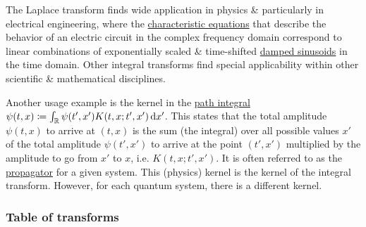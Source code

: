 \documentclass{article}
\begin{document}
The Laplace transform finds wide application in physics \& particularly in electrical engineering, where the \href{https://en.wikipedia.org/wiki/Characteristic_equation_(calculus)}{characteristic equations} that describe the behavior of an electric circuit in the complex frequency domain correspond to linear combinations of exponentially scaled \& time-shifted \href{https://en.wikipedia.org/wiki/Damped_sinusoid}{damped sinusoids} in the time domain. Other integral transforms find special applicability within other scientific \& mathematical disciplines.

Another usage example is the kernel in the \href{https://en.wikipedia.org/wiki/Path_integral_formulation#Path_integral_in_quantum_mechanics}{path integral} $\psi(t,x)\coloneqq\int_\mathbb{R} \psi(t',x')K(t,x;t',x')\,{\rm d}x'$. This states that the total amplitude $\psi(t,x)$ to arrive at $(t,x)$ is the sum (the integral) over all possible values $x'$ of the total amplitude $\psi(t',x')$ to arrive at the point $(t',x')$ multiplied by the amplitude to go from $x'$ to $x$, i.e. $K(t,x;t',x')$. It is often referred to as the \href{https://en.wikipedia.org/wiki/Propagator}{propagator} for a given system. This (physics) kernel is the kernel of the integral transform. However, for each quantum system, there is a different kernel.

\subsubsection{Table of transforms}
\end{document}
